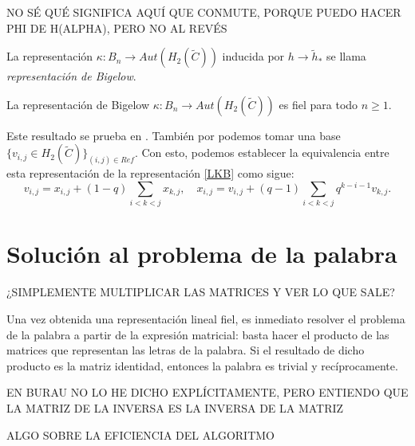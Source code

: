 \documentclass[TFG.tex]{subfiles}
\begin{document}
NO SÉ QUÉ SIGNIFICA AQUÍ QUE CONMUTE, PORQUE PUEDO HACER PHI DE H(ALPHA), PERO NO AL REVÉS

\begin{defi}
La representación $\kappa:B_n\to Aut(H_2(\tilde{C}))$ inducida por $h\to\tilde{h}_*$ se llama \emph{representación de Bigelow}.
\end{defi}

\begin{teorema}
La representación de Bigelow $\kappa:B_n\to Aut(H_2(\tilde{C}))$ es fiel para todo $n\geq 1$.
\end{teorema}

Este resultado se prueba en \cite{Bil}. También por \cite{Bil} podemos tomar una base $\{v_{i,j}\in H_2(\tilde{C})\}_{(i,j)\in Ref}$. Con esto, podemos establecer la equivalencia \cite{nundam} entre esta representación de la representación  \ref{LKB} como sigue:
\[
v_{i,j}=x_{i,j}+(1-q)\sum_{i<k<j}x_{k,j},\quad x_{i,j}=v_{i,j}+(q-1)\sum_{i<k<j}q^{k-i-1}v_{k,j}.
\]


\section{Solución al problema de la palabra}
¿SIMPLEMENTE MULTIPLICAR LAS MATRICES Y VER LO QUE SALE?

Una vez obtenida una representación lineal fiel, es inmediato resolver el problema de la palabra a partir de la expresión matricial: basta hacer el producto de las matrices que representan las letras de la palabra. Si el resultado de dicho producto es la matriz identidad, entonces la palabra es trivial y recíprocamente.

EN BURAU NO LO HE DICHO EXPLÍCITAMENTE, PERO ENTIENDO QUE LA MATRIZ DE LA INVERSA ES LA INVERSA DE LA MATRIZ

ALGO SOBRE LA EFICIENCIA DEL ALGORITMO
\end{document}
